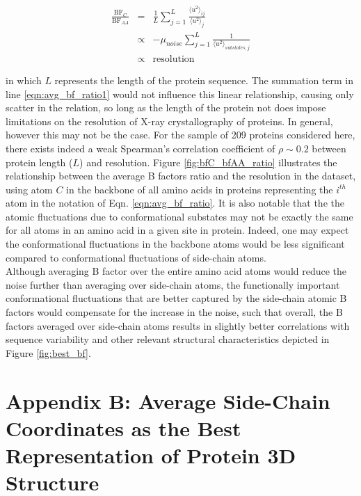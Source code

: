 \documentclass[11pt]{article}
\begin{document}
    \begin{eqnarray}
        \frac{\text{BF}_C}{\text{BF}_{AA}} &=& \frac{1}{L}\sum_{j=1}^{L}\frac{\langle u^2 \rangle_{ij}}{\langle u^2 \rangle_{j}} \label{eqn:avg_bf_ratio} \\
                                           &\propto& -\mu_{noise} \sum_{j=1}^{L}\frac{1}{\langle u^2 \rangle_{substates,j}} \label{eqn:avg_bf_ratio1} \\
                                           &\propto& \text{resolution}
    \end {eqnarray}

    \noindent in which $L$ represents the length of the protein sequence. The summation term in line \ref{eqn:avg_bf_ratio1} would not influence this linear relationship, causing only scatter in the relation, so long as the length of the protein not does impose limitations on the resolution of X-ray crystallography of proteins. In general, however this may not be the case. For the sample of 209 proteins considered here, there exists indeed a weak Spearman's correlation coefficient of $\rho\sim0.2$ between protein length ($L$) and resolution. Figure \ref{fig:bfC_bfAA_ratio} illustrates the relationship between the average B factors ratio and the resolution in the dataset, using atom $C$ in the backbone of all amino acids in proteins representing the $i^{th}$ atom in the notation of Eqn. \ref{eqn:avg_bf_ratio}. It is also notable that the the atomic fluctuations due to conformational substates may not be exactly the same for all atoms in an amino acid in a given site in protein. Indeed, one may expect the conformational fluctuations in the backbone atoms would be less significant compared to conformational fluctuations of side-chain atoms. \\

    Although averaging B factor over the entire amino acid atoms would reduce the noise further than averaging over side-chain atoms, the functionally important conformational fluctuations that are better captured by the side-chain atomic B factors would compensate for the increase in the noise, such that overall, the B factors averaged over side-chain atoms results in slightly better correlations with sequence variability and other relevant structural characteristics depicted in Figure \ref{fig:best_bf}. \\

    \section*{Appendix B: Average Side-Chain Coordinates as the Best Representation of Protein 3D Structure}
    \label{app:best_crd}
\end{document}
